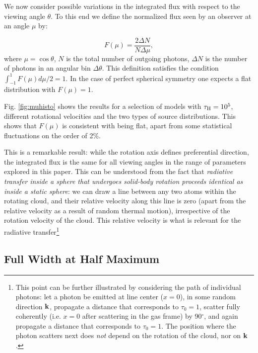 \documentclass{emulateapj}
\begin{document}
We now consider possible variations in the integrated flux with
respect to the viewing angle $\theta$. 
To this end we  define the normalized flux seen by an observer at an
angle $\mu$ by:  


\begin{equation}
F(\mu) = \frac{2\Delta N}{N\Delta \mu}, 
\end{equation} 
%
where $\mu=\cos\theta$, $N$ is the total number of outgoing photons,
$\Delta N$ is the number of photons in an angular bin $\Delta
\theta$. This definition satisfies the condition
$\int_{-1}^{1}F(\mu)d\mu/2=1$.  In the case of perfect spherical
symmetry one expects a flat distribution with $F(\mu)=1$.

Fig. \ref{fig:muhisto} shows the results for a selection of models
with $\tau_{\rm H}=10^{5}$, different rotational velocities and the two
types of source distributions. This shows that $F(\mu)$ is consistent with being flat, apart
from some statistical fluctuations on the order of 2\%. 

This is a remarkable result: while the rotation axis defines preferential direction, the
integrated flux is the same for all viewing angles in the range of parameters explored in this paper. This can be understood from the fact that
{\it radiative transfer inside a sphere that undergoes solid-body
  rotation proceeds identical as inside a static sphere}: we can draw
a line between any two atoms within the rotating cloud, and their
relative velocity along this line is zero (apart from the relative
velocity as a result of random thermal motion), irrespective of the
rotation velocity of the cloud. This relative velocity is what is
relevant for the radiative transfer\footnote{This point can be further
  illustrated by considering the path of individual photons: let a
  photon be emitted at line center ($x=0$), in some random direction
  ${\bf k}$, propagate a distance that corresponds to $\tau_0=1$,
  scatter fully coherently (i.e. $x=0$ after scattering in the gas
  frame) by 90$^{\circ}$, and again propagate a distance that
  corresponds to $\tau_0=1$. The position where the photon scatters
  next does {\it not} depend on the rotation of the cloud, nor on
  ${\bf k}$.}
	
\subsection{Full Width at Half Maximum}
\label{sec:widthpeak}
\end{document}
